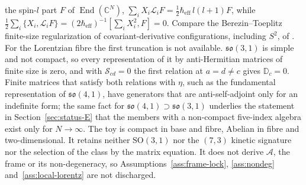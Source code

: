 the spin-\(l\) part \(F\) of \(\operatorname{End}(\mathbb C^N)\), \(\sum_iX_i\mathcal L_iF=\tfrac12\hbar_{\mathrm{eff}}\,l(l+1)F\), while \(\tfrac12\sum_i\{X_i,\mathcal L_iF\}=(2\hbar_{\mathrm{eff}})^{-1}[\sum_iX_i^2,F]=0\). Compare the Berezin--Toeplitz finite-size regularization of covariant-derivative configurations, including \(S^2\), of \cite{HattoriSekoTsuchiya2026}. For the Lorentzian fibre the first truncation is not available. \(\mathfrak{so}(3,1)\) is simple and not compact, so every representation of it by anti-Hermitian matrices of finite size is zero, and with \(\mathcal S_{cd}=0\) the first relation at \(a=d\neq c\) gives \(\mathbb D_c=0\). Finite matrices that satisfy both relations with \(\eta\), such as the fundamental representation of \(\mathfrak{so}(4,1)\), have generators that are anti-self-adjoint only for an indefinite form; the same fact for \(\mathfrak{so}(4,1)\supset\mathfrak{so}(3,1)\) underlies the statement in Section~\ref{sec:status-E} that the members with a non-compact five-index algebra exist only for \(N\to\infty\). The toy is compact in base and fibre, Abelian in fibre and two-dimensional. It retains neither \(\mathrm{SO}(3,1)\) nor the \((7,3)\) kinetic signature nor the selection of the class by the matrix equation. It does not derive \(\mathcal A\), the frame or its non-degeneracy, so Assumptions~\ref{ass:frame-lock}, \ref{ass:nondeg} and~\ref{ass:local-lorentz} are not discharged.


